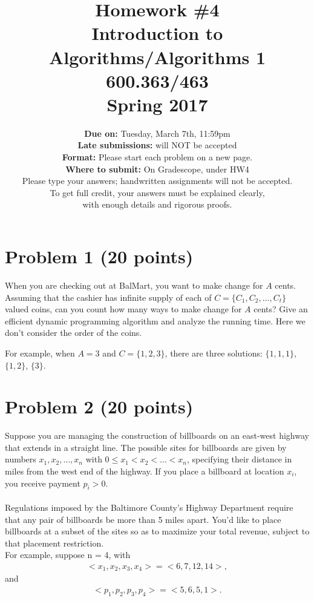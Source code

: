 \documentclass[letterpaper, 11pt]{article}
\begin{document}
\title{Homework \#4 \\ Introduction to Algorithms/Algorithms 1 \\ 600.363/463 \\Spring 2017}
\author{\textbf{Due on:} Tuesday, March 7th, 11:59pm \\
\textbf{Late submissions:} will NOT be accepted\\
\textbf{Format:} Please start each problem on a new page.
\\\textbf{Where to submit:} On Gradescope, under HW4
\\ Please type your answers; handwritten assignments will not be accepted.
\\ To get full credit, your answers must be explained clearly,\\ with enough details
and rigorous proofs.
\\}

\maketitle




\section{Problem 1 (20 points)} %
When you are checking out at BalMart,  you want to make change for $A$ cents.  Assuming that the cashier has infinite supply of each of $C= \{ C_1, C_2,\dots,C_t\}$ valued coins, can you count how many ways to make change for $A$ cents? Give an efficient dynamic programming algorithm and analyze the running time. Here we don't consider the order of the coins.

For example, when $A = 3$ and $C = \{1,2,3\}$, there are three solutions: $\{1,1,1\}$, $\{1,2\}$, $\{3\}$. 

\section{Problem 2 (20 points)}
Suppose you are managing the construction of billboards on an east-west highway that extends in a straight line. The possible sites for billboards are given by numbers $x_1, x_2,\dots, x_n$ with $0 \le x_1 < x_2 < \dots < x_n$, specifying their distance in miles from the west end of the highway. If you place a billboard at location $x_i$, you receive payment $p_i > 0$.\\\\
Regulations imposed by the Baltimore County's Highway Department require that any pair of billboards be more than 5 miles apart. You'd like to place billboards at a subset of the sites so as to maximize your total revenue, subject to that placement restriction.\\
 For example, suppose n = 4, with\\
 \begin{align*}
 <x_1,x_2,x_3,x_4> = <6,7,12,14>,
 \end{align*}
and 
\begin{align*}
<p_1,p_2,p_3,p_4> = <5,6,5,1>.
\end{align*}
\end{document}

